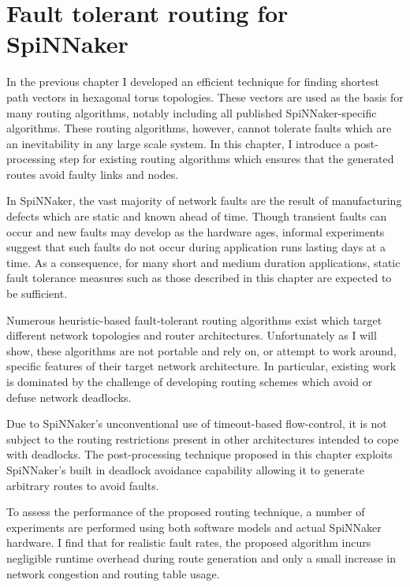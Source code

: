 \chapter{Fault tolerant routing for SpiNNaker}
	
	\label{sec:routing}
	
	In the previous chapter I developed an efficient technique for finding
	shortest path vectors in hexagonal torus topologies. These vectors are used
	as the basis for many routing algorithms, notably including all published
	SpiNNaker-specific algorithms. These routing algorithms, however, cannot
	tolerate faults which are an inevitability in any large scale system. In this
	chapter, I introduce a post-processing step for existing routing algorithms
	which ensures that the generated routes avoid faulty links and nodes.
	
	In SpiNNaker, the vast majority of network faults are the result of
	manufacturing defects which are static and known ahead of time. Though
	transient faults can occur and new faults may develop as the hardware ages,
	informal experiments suggest that such faults do not occur during application
	runs lasting days at a time.  As a consequence, for many short and medium
	duration applications, static fault tolerance measures such as those
	described in this chapter are expected to be sufficient.
	
	Numerous heuristic-based fault-tolerant routing algorithms exist which target
	different network topologies and router architectures. Unfortunately as I
	will show, these algorithms are not portable and rely on, or attempt to work
	around, specific features of their target network architecture. In
	particular, existing work is dominated by the challenge of developing routing
	schemes which avoid or defuse network deadlocks.
	
	Due to SpiNNaker's unconventional use of timeout-based flow-control, it is
	not subject to the routing restrictions present in other architectures
	intended to cope with deadlocks. The post-processing technique proposed in
	this chapter exploits SpiNNaker's built in deadlock avoidance capability
	allowing it to generate arbitrary routes to avoid faults.
	
	To assess the performance of the proposed routing technique, a number of
	experiments are performed using both software models and actual SpiNNaker
	hardware. I find that for realistic fault rates, the proposed algorithm
	incurs negligible runtime overhead during route generation and only a small
	increase in network congestion and routing table usage.
	
